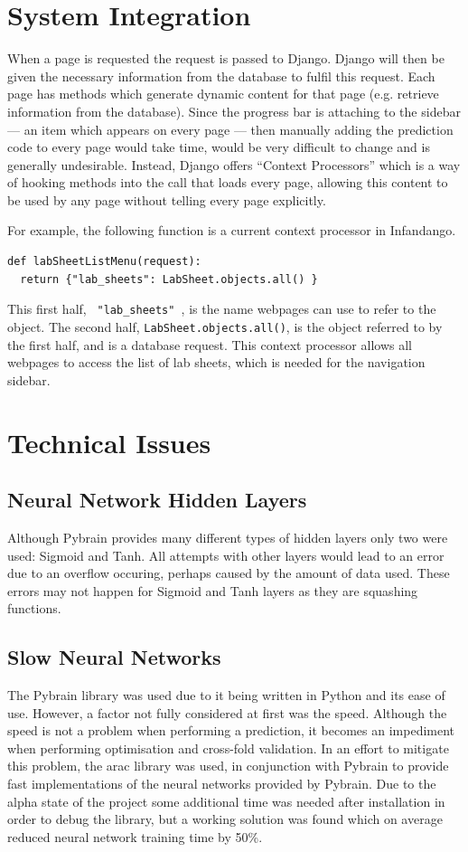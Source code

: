\section{System Integration}
When a page is requested the request is passed to Django. Django will then be given the necessary information from the database to fulfil this request. Each page has methods which generate dynamic content for that page (e.g. retrieve information from the database). Since the progress bar is attaching to the sidebar --- an item which appears on every page --- then manually adding the prediction code to every page would take time, would be very difficult to change and is generally undesirable. Instead, Django offers ``Context Processors''\cite{django_cp} which is a way of hooking methods into the call that loads every page, allowing this content to be used by any page without telling every page explicitly. 

For example, the following function is a current context processor in Infandango.

\begin{verbatim}
def labSheetListMenu(request):
  return {"lab_sheets": LabSheet.objects.all() }
\end{verbatim}

This first half, \texttt{ "lab\_sheets" }, is the name webpages can use to refer to the object. The second half, \texttt{LabSheet.objects.all()}, is the object referred to by the first half, and is a database request. This context processor allows all webpages to access the list of lab sheets, which is needed for the navigation sidebar.

\section{Technical Issues}

\subsection{Neural Network Hidden Layers}
Although Pybrain provides many different types of hidden layers only two were used: Sigmoid and Tanh. All attempts with other layers would lead to an error due to an overflow occuring, perhaps caused by the amount of data used. These errors may not happen for Sigmoid and Tanh layers as they are squashing functions.

\subsection{Slow Neural Networks}
The Pybrain library was used due to it being written in Python and its ease of use. However, a factor not fully considered at first was the speed. Although the speed is not a problem when performing a prediction, it becomes an impediment when performing optimisation and cross-fold validation. In an effort to mitigate this problem, the arac library\cite{arac_site} was used, in conjunction with Pybrain to provide fast implementations of the neural networks provided by Pybrain. Due to the alpha state of the project some additional time was needed after installation in order to debug the library, but a working solution was found which on average reduced neural network training time by 50\%.

